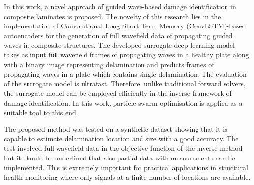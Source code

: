 In this work, a novel approach of guided wave-based damage identification in composite laminates is proposed. 
The novelty of this research lies in the implementation of Convolutional Long Short Term Memory (ConvLSTM)-based autoencoders for the generation of full wavefield data of propagating guided waves in composite structures.
The developed surrogate deep learning model takes as input full wavefield frames of propagating waves in a healthy plate along with a binary image representing delamination and predicts frames of propagating waves in a plate which contains single delamination.
The evaluation of the surrogate model is ultrafast.
Therefore, unlike traditional forward solvers, the surrogate model can be employed efficiently in the inverse framework of damage identification.
In this work, particle swarm optimisation is applied as a suitable tool to this 
end. 

The proposed method was tested on a synthetic dataset showing that it is capable to estimate delamination location and size with a good accuracy.
The test involved full wavefield data in the objective function of the inverse 
method but it should be underlined that also partial data with measurements can 
be implemented.
This is extremely important for practical applications in structural health 
monitoring where only signals at a finite number of locations are available.